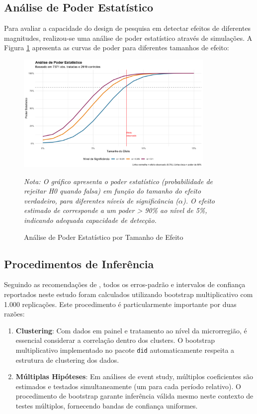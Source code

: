 \documentclass[
	12pt,				%
	oneside,			%
	a4paper,			%
	english,			%
	french,				%
	spanish,			%
	brazil				%
	]{abntex2}
\begin{document}
\subsection{Análise de Poder Estatístico}

Para avaliar a capacidade do design de pesquisa em detectar efeitos de diferentes magnitudes, realizou-se uma análise de poder estatístico através de simulações. A Figura \ref{fig:power} apresenta as curvas de poder para diferentes tamanhos de efeito:

\begin{figure}[htbp]
\centering
\caption{Análise de Poder Estatístico por Tamanho de Efeito}
\label{fig:power}
\includegraphics[width=0.85\textwidth]{../../../data/outputs/additional_figures/power_analysis_simulation.png}

\textit{Nota: O gráfico apresenta o poder estatístico (probabilidade de rejeitar H0 quando falsa) em função do tamanho do efeito verdadeiro, para diferentes níveis de significância ($\alpha$). O efeito estimado de \mainattpct{} corresponde a um poder > 90\% ao nível de 5\%, indicando adequada capacidade de detecção.}
\end{figure}

\subsection{Procedimentos de Inferência}

Seguindo as recomendações de , todos os erros-padrão e intervalos de confiança reportados neste estudo foram calculados utilizando bootstrap multiplicativo com 1.000 replicações. Este procedimento é particularmente importante por duas razões:

\begin{enumerate}
\item \textbf{Clustering}: Com dados em painel e tratamento ao nível da microrregião, é essencial considerar a correlação dentro dos clusters. O bootstrap multiplicativo implementado no pacote \texttt{did} automaticamente respeita a estrutura de clustering dos dados.

\item \textbf{Múltiplas Hipóteses}: Em análises de event study, múltiplos coeficientes são estimados e testados simultaneamente (um para cada período relativo). O procedimento de bootstrap garante inferência válida mesmo neste contexto de testes múltiplos, fornecendo bandas de confiança uniformes.
\end{enumerate}
\end{document}

